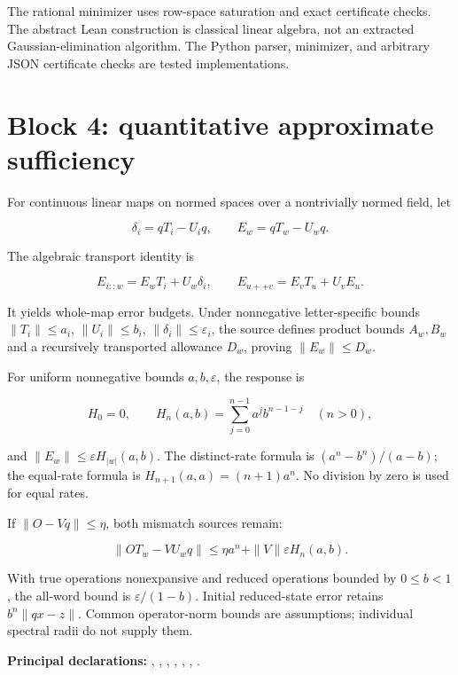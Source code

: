 \documentclass[11pt]{article}
\begin{document}
The rational minimizer uses row-space saturation and exact certificate
checks. The abstract Lean construction is classical linear algebra, not
an extracted Gaussian-elimination algorithm. The Python parser,
minimizer, and arbitrary JSON certificate checks are tested
implementations.

\hypertarget{block-4-quantitative-approximate-sufficiency}{%
\section{Block 4: quantitative approximate
sufficiency}\label{block-4-quantitative-approximate-sufficiency}}

For continuous linear maps on normed spaces over a nontrivially normed
field, let

\[
\delta_i=qT_i-U_iq,\qquad E_w=qT_w-U_wq.
\]

The algebraic transport identity is

\[
E_{i::w}=E_wT_i+U_w\delta_i,
\qquad E_{u++v}=E_vT_u+U_vE_u.
\]

It yields whole-map error budgets. Under nonnegative letter-specific
bounds \(\|T_i\|\le a_i\), \(\|U_i\|\le b_i\),
\(\|\delta_i\|\le\varepsilon_i\), the source defines product bounds
\(A_w,B_w\) and a recursively transported allowance \(D_w\), proving
\(\|E_w\|\le D_w\).

For uniform nonnegative bounds \(a,b,\varepsilon\), the response is

\[
H_0=0,\qquad
H_n(a,b)=\sum_{j=0}^{n-1}a^jb^{n-1-j}\quad(n>0),
\]

and \(\|E_w\|\le\varepsilon H_{|w|}(a,b)\). The distinct-rate formula is
\((a^n-b^n)/(a-b)\); the equal-rate formula is
\(H_{n+1}(a,a)=(n+1)a^n\). No division by zero is used for equal rates.

If \(\|O-Vq\|\le\eta\), both mismatch sources remain:

\[
\|OT_w-VU_wq\|\le\eta a^n+\|V\|\varepsilon H_n(a,b).
\]

With true operations nonexpansive and reduced operations bounded by
\(0\le b<1\), the all-word bound is \(\varepsilon/(1-b)\). Initial
reduced-state error retains \(b^n\|qx-z\|\). Common operator-norm bounds
are assumptions; individual spectral radii do not supply them.

\textbf{Principal declarations:}
\texttt{},
\texttt{},
\texttt{},
\texttt{},
\texttt{},
\texttt{},
\texttt{}.
\end{document}

